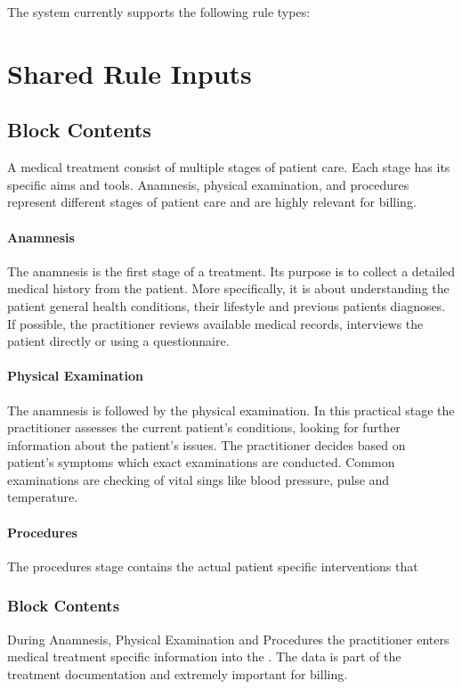 The system currently supports the following rule types:


\section{Shared Rule Inputs}
\subsection{Block Contents}
A medical treatment consist of multiple stages of patient care.
Each stage has its specific aims and tools.
Anamnesis, physical examination, and procedures represent different stages of patient care and are highly relevant for billing.

\paragraph{Anamnesis}
The anamnesis is the first stage of a treatment.
Its purpose is to collect a detailed medical history from the patient\cite{lino2021medical}.
More specifically, it is about understanding the patient general health conditions, their lifestyle and previous patients diagnoses.
If possible, the practitioner reviews available medical records, interviews the patient directly or using a questionnaire\cite{zhang2011anamnevis}.


\paragraph{Physical Examination}
The anamnesis is followed by the physical examination.
In this practical stage the practitioner assesses the current patient's conditions, looking for further information about the patient's issues\cite{seidel2010mosby}.
The practitioner decides based on patient's symptoms which exact examinations are conducted.
Common examinations are checking of vital sings like blood pressure, pulse and temperature.

\paragraph{Procedures}
The procedures stage contains the actual patient specific interventions that



\subsubsection{Block Contents}
During Anamnesis, Physical Examination and Procedures the practitioner enters medical treatment specific information into the \AVS.
The data is part of the treatment documentation and extremely important for billing.

